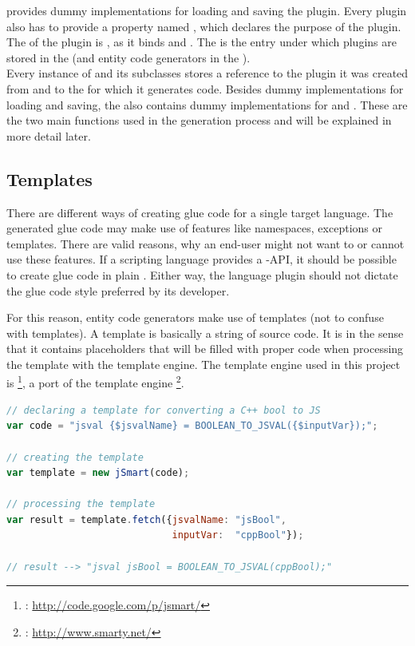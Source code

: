  provides dummy implementations for loading and saving the plugin. Every plugin also has to provide a property named , which declares the purpose of the plugin. The  of the  plugin is , as it binds  and . The  is the entry under which plugins are stored in the  (and entity code generators in the ).
\\Every instance of  and its subclasses stores a reference to the plugin it was created from and to the  for which it generates code. Besides dummy implementations for loading and saving, the  also contains dummy implementations for  and . These are the two main functions used in the generation process and will be explained in more detail later.

\subsection{Templates}

There are different ways of creating glue code for a single target language. The generated glue code may make use of  features like namespaces, exceptions or templates. There are valid reasons, why an end-user might not want to or cannot use these features. If a scripting language provides a -API, it should be possible to create glue code in plain . Either way, the language plugin should not dictate the glue code style preferred by its developer.

For this reason, entity code generators make use of templates (not to confuse with  templates). A template is basically a string of  source code. It is  in the sense that it contains placeholders that will be filled with proper code when processing the template with the template engine. The template engine used in this project is \footnote{: \url{http://code.google.com/p/jsmart/}}, a  port of the  template engine \footnote{: \url{http://www.smarty.net/}}.

\SingleSpacing
\begin{lstlisting}[language=JavaScript, caption=Example of using a \myProperName{jSmart} template (for type conversion), label=lst:TemplateBool]
// declaring a template for converting a C++ bool to JS
var code = "jsval {$jsvalName} = BOOLEAN_TO_JSVAL({$inputVar});";

// creating the template
var template = new jSmart(code);

// processing the template
var result = template.fetch({jsvalName: "jsBool", 
                             inputVar:  "cppBool"});
                             
// result --> "jsval jsBool = BOOLEAN_TO_JSVAL(cppBool);"
\end{lstlisting}
\OnehalfSpacing

